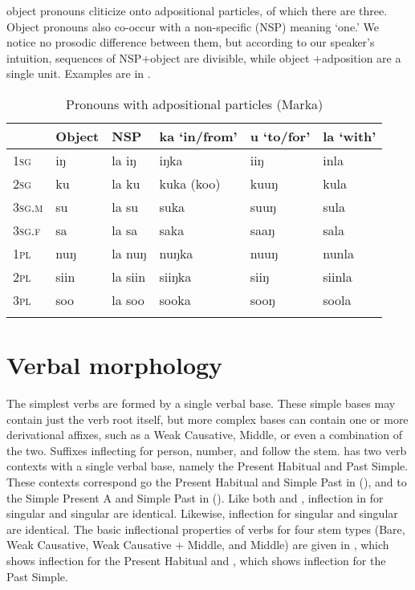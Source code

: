 \documentclass[output=paper,modfonts,nonflat,
hidelinks
]{langsci/langscibook}
\begin{document}
  object pronouns cliticize onto adpositional particles, of which there are three. Object pronouns also co-occur with a non-specific  (NSP) meaning `one.' We notice no prosodic difference between them, but according to our speaker's intuition, sequences of NSP$+$object  are divisible, while object $+$adposition are a single unit. Examples are in .\\
  
\begin{table}
 	\caption{{Pronouns with adpositional particles (Marka)}}
 	\label{tab:1:Pronouns Adpositions}
 	\begin{tabularx}{\textwidth}{Xlllll} 
 		\lsptoprule
 		& Object \isi{pronoun} & NSP  & ka `in/from' & u `to/for' & la `with' \\ 
 		\midrule
 		1\textsc{sg} & iŋ & la iŋ & iŋka & iiŋ & inla \\
 		2\textsc{sg} & ku  & la ku & kuka (koo)  & kuuŋ & kula  \\
 		3\textsc{sg.m} & su & la su & suka & suuŋ & sula \\
 		3\textsc{sg.f} & sa & la sa & saka & saaŋ & sala \\
 		1\textsc{pl} & nuŋ & la nuŋ & nuŋka & nuuŋ & nunla \\
 		2\textsc{pl} & siin & la siin & siiŋka & siiŋ & siinla  \\
 		3\textsc{pl} & soo & la soo & sooka & sooŋ & soola \\
 		\lspbottomrule
 	\end{tabularx}
 \end{table}
 
 \section{Verbal morphology}
 
The simplest  verbs are formed by a single verbal base. These simple bases may contain just the verb root itself, but more complex bases can contain one or more derivational affixes, such as a Weak Causative, Middle, or even a combination of the two. Suffixes inflecting for person, number, and  follow the stem.  has two verb contexts with a single verbal base, namely the Present Habitual and Past Simple. These contexts correspond go the Present Habitual and Simple Past in  (\citealt{Greenetal2015}), and to the Simple Present A and Simple Past in  (\citealt{PasterRanero2015}). Like both  and , inflection in  for  singular and   singular are identical. Likewise, inflection for  singular and   singular are identical. The basic inflectional properties of  verbs for four stem types (Bare, Weak Causative, Weak Causative + Middle, and Middle) are given in , which shows inflection for the Present Habitual and , which shows inflection for the Past Simple. 
 
\end{document}
